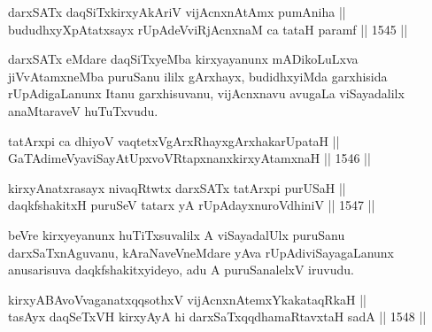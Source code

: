 
\begin{shl}
darxSATx daqSiTxkirxyAkAriV vijAcnxnAtAmx pumAniha || \\
bududhxyXpAtatxsayx rUpAdeVviRjAcnxnaM ca tataH paramf \hfill || 1545 ||  
\end{shl}

\begin{artha}
darxSATx eMdare daqSiTxyeMba kirxyayanunx mADikoLuLxva jiVvAtamxneMba puruSanu ililx gArxhayx, budidhxyiMda garxhisida rUpAdigaLanunx Itanu garxhisuvanu, vijAcnxnavu avugaLa viSayadalilx anaMtaraveV huTuTxvudu.
\end{artha}

\begin{shl}
tatArxpi ca dhiyoV vaqtetxVgArxRhayxgArxhakarUpataH || \\
GaTAdimeVyaviSayAtUpxvoVRtapxnanxkirxyAtamxnaH \hfill || 1546 ||  
\end{shl}



\begin{shl}
kirxyAnatxrasayx nivaqRtwtx darxSATx tatArxpi purUSaH || \\
daqkfshakitxH puruSeV tatarx yA rUpAdayxnuroVdhiniV \hfill || 1547 ||  
\end{shl}

\begin{artha}
beVre kirxyeyanunx huTiTxsuvalilx A viSayadalUlx puruSanu darxSaTxnAguvanu, kAraNaveVneMdare yAva rUpAdiviSayagaLanunx anusarisuva daqkfshakitxyideyo, adu A puruSanalelxV iruvudu.
\end{artha}



\begin{shl}
\footnotemark[1]kirxyABAvoV\s vaganatxqqsothxV vijAcnxnAtemxYkakataqRkaH || \\
tasAyx daqSeTxVH kirxyAyA hi darxSaTxqqdhamaRtavxtaH sadA \hfill || 1548 ||  
\end{shl}
				
